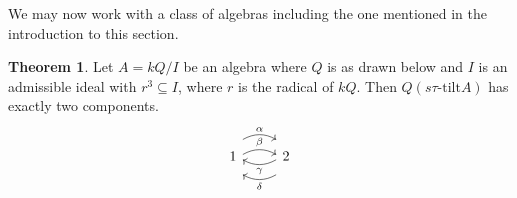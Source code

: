 \documentclass[]{article}
\theoremstyle{definition}
\newtheorem{theorem}{Theorem}[section]
\newcommand{\tu}{\ensuremath{\tau}}
\begin{document}
We may now work with a class of algebras including the one mentioned in the introduction to this section.

\begin{theorem}\label{kq/r3}
	Let $A = kQ/I$ be an algebra where $Q$ is as drawn below and $I$ is an admissible ideal with $r^3 \subseteq I$, where $r$ is the radical of $kQ$. Then $Q(s\tu\text{-tilt} A)$ has exactly two components.
	\[\begin{tikzcd}
		1 
		\arrow[r,bend left,shift right = 0.5ex, "\beta"]
		\arrow[r,bend left, shift left = 2ex, "\alpha"]
		& 2 \arrow[l,bend left,shift right = 0.5ex,"\gamma"]
		\arrow[l,bend left,shift left = 2ex, "\delta"]  \\
	\end{tikzcd}
	\]
\end{theorem}
\end{document}
